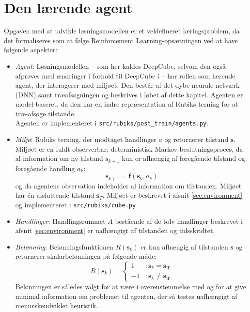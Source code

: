 \documentclass[../main.tex]{subfiles}
\begin{document}
\section{Den lærende agent}\label{sec:learnADI}
Opgaven med at udvikle løsningsmodellen er et veldefineret læringsproblem, da det formaliseres som at følge Reinforcement Learning-opsætningen ved at have følgende aspekter:
\begin{itemize}
	\item \textit{Agent}: Løsningsmodellen -- som her kaldes DeepCube, selvom den også afprøves med ændringer i forhold til DeepCube i \cite{HumansBeGone} -- har rollen som lærende agent, der interagerer med miljøet. Den består af det dybe neurale netværk (DNN) samt træafsøgningen og beskrives i løbet af dette kapitel. Agenten er model-baseret, da den har en indre repræsentation af Rubiks terning for at træ-afsøge tilstande.  \\
	Agenten er implementeret i  \texttt{src/rubiks/post\_train/agents.py}.
	\item \textit{Miljø}: Rubiks terning, der modtaget handlinger \(a\) og returnerer tilstand \(\mathbf s\). Miljøet er en fuldt-observerbar, deterministisk Markov beslutningsproces, da al information om ny tilstand \(\mathbf s_{k+1}\) kun er afhængig af foregående tilstand og foregående handling \(a_k\):
	\[
		\mathbf s _ {k+1} = \mathbf f(\mathbf s _k, a_k)
	\] 
	og da agentens observation indeholder al information om tilstanden. Miljøet har én afsluttende tilstand \(\mathbf s_T\). Miljøet er  beskrevet i afsnit \ref{sec:environment} og implementeret i \texttt{src/rubiks/cube.py} 
	\item  \textit{Handlinger}: Handlingsrummet \(A\) bestående af de tolv handlinger beskrevet i afsnit \ref{sec:environment} er uafhængigt af tilstanden og tidsskridtet.
	\item \textit{Belønning}: Belønningsfunktionen \( R(\mathbf s_k)\) er kun afhængig af tilstanden \(\mathbf s\) og returnerer skalarbelønningen på følgende måde:
	\[
		R (\mathbf s_k) = 
		\begin{cases}
			1  &: \mathbf s_k = \mathbf{s_T}\\
			-1 &: \mathbf s_k \neq \mathbf{s_T}
		\end{cases}
	\] 
	Belønningen er således valgt for at være i overenstemmelse med \cite{HumansBeGone} og for at give minimal information om problemet til agenten, der så testes uafhængigt af menneskeudviklet heuristik.
\end{itemize}
\end{document}
